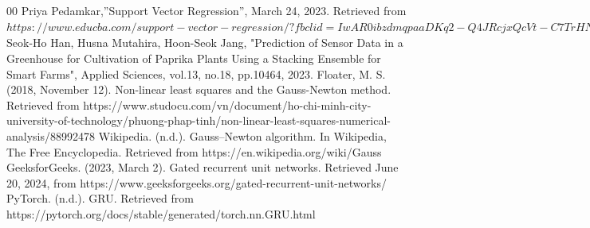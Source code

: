 \documentclass{ieeeojies}
\begin{document}
\begin{thebibliography}{00}
 Priya Pedamkar,''Support Vector Regression'', March 24, 2023. Retrieved from \(https://www.educba.com/support-vector-regression/?fbclid=IwAR0ibzdmqpaaDKq2-Q4JRcjxQcVt-C7TrHNEc90q_tCSrn8rds9x2AG8Y78\)
 Seok-Ho Han, Husna Mutahira, Hoon-Seok Jang, "Prediction of Sensor Data in a Greenhouse for Cultivation of Paprika Plants Using a Stacking Ensemble for Smart Farms", Applied Sciences, vol.13, no.18, pp.10464, 2023.
Floater, M. S. (2018, November 12). Non-linear least squares and the Gauss-Newton method. Retrieved from https://www.studocu.com/vn/document/ho-chi-minh-city-university-of-technology/phuong-phap-tinh/non-linear-least-squares-numerical-analysis/88992478
Wikipedia. (n.d.). Gauss–Newton algorithm. In Wikipedia, The Free Encyclopedia. Retrieved from https://en.wikipedia.org/wiki/Gauss%
GeeksforGeeks. (2023, March 2). Gated recurrent unit networks. Retrieved June 20, 2024, from https://www.geeksforgeeks.org/gated-recurrent-unit-networks/
PyTorch. (n.d.). GRU. Retrieved from https://pytorch.org/docs/stable/generated/torch.nn.GRU.html

\end{thebibliography}


\EOD
\end{document}
